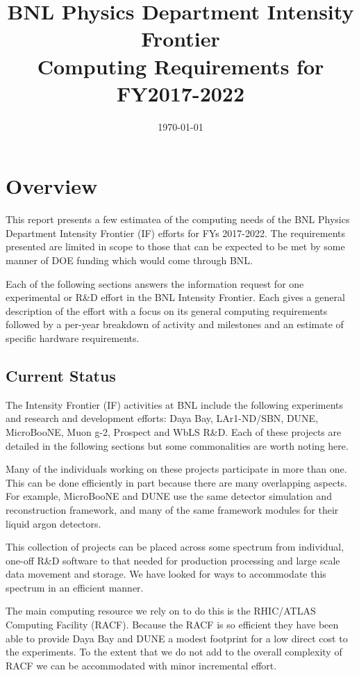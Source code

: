 \documentclass[pdftex,12pt,letter]{article}
\title{BNL Physics Department Intensity Frontier\\Computing Requirements for FY2017-2022}
\date{\today}
\begin{document}
\maketitle
\tableofcontents

%

\newpage
\section{Overview}
This report presents a few estimatea of the computing needs of
the BNL Physics Department Intensity Frontier (IF) efforts for FYs
2017-2022. The requirements presented are limited in scope to those
that can be expected to be met by some manner of DOE funding which
would come through BNL.

Each of the following sections answers the information request for one
experimental or R\&D effort in the BNL Intensity Frontier.
Each gives a general description of the effort with a focus on its
general computing requirements followed by a per-year breakdown of activity and
milestones and an estimate of specific hardware requirements.

\subsection{Current Status}

The Intensity Frontier (IF) activities at BNL include the following
experiments and research and development efforts:
%
Daya Bay,
LAr1-ND/SBN,
DUNE,
MicroBooNE,
Muon g-2,
Prospect and
WbLS R\&D.
%
Each of these projects are detailed in the following sections but some
commonalities are worth noting here.

Many of the individuals working on these projects participate in more
than one.
This can be done efficiently in part because there are many
overlapping aspects.
For example, MicroBooNE and DUNE  use the same detector
simulation and reconstruction framework, and many of the same
framework modules for their liquid argon detectors.


This collection of projects can be placed across some spectrum from
individual, one-off R\&D software to that needed for production
processing and large scale data movement and storage.
We have looked for ways to accommodate this spectrum in an efficient
manner.  

The main computing resource  we rely on to do this is the RHIC/ATLAS Computing
Facility (RACF). Because the RACF is so efficient they have been able to provide Daya
Bay and DUNE a modest footprint for a low direct cost to the experiments.
To the extent that we do not add to the overall complexity of RACF we
can be accommodated with minor incremental effort.
\end{document}
